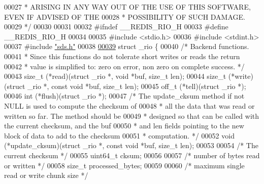\begin{DoxyCode}
00027 \textcolor{comment}{ * ARISING IN ANY WAY OUT OF THE USE OF THIS SOFTWARE, EVEN IF ADVISED OF THE}
00028 \textcolor{comment}{ * POSSIBILITY OF SUCH DAMAGE.}
00029 \textcolor{comment}{ */}
00030 
00031 
00032 \textcolor{preprocessor}{#}\textcolor{preprocessor}{ifndef} \textcolor{preprocessor}{\_\_REDIS\_RIO\_H}
00033 \textcolor{preprocessor}{#}\textcolor{preprocessor}{define} \textcolor{preprocessor}{\_\_REDIS\_RIO\_H}
00034 
00035 \textcolor{preprocessor}{#}\textcolor{preprocessor}{include} \textcolor{preprocessor}{<}\textcolor{preprocessor}{stdio}\textcolor{preprocessor}{.}\textcolor{preprocessor}{h}\textcolor{preprocessor}{>}
00036 \textcolor{preprocessor}{#}\textcolor{preprocessor}{include} \textcolor{preprocessor}{<}\textcolor{preprocessor}{stdint}\textcolor{preprocessor}{.}\textcolor{preprocessor}{h}\textcolor{preprocessor}{>}
00037 \textcolor{preprocessor}{#}\textcolor{preprocessor}{include} \hyperlink{sds_8h}{"sds.h"}
00038 
\hyperlink{struct__rio}{00039} \textcolor{keyword}{struct} \_rio \{
00040     \textcolor{comment}{/* Backend functions.}
00041 \textcolor{comment}{     * Since this functions do not tolerate short writes or reads the return}
00042 \textcolor{comment}{     * value is simplified to: zero on error, non zero on complete success. */}
00043     size\_t (*read)(\textcolor{keyword}{struct} \_rio *, \textcolor{keywordtype}{void} *buf, size\_t len);
00044     size\_t (*write)(\textcolor{keyword}{struct} \_rio *, \textcolor{keyword}{const} \textcolor{keywordtype}{void} *buf, size\_t len);
00045     off\_t (*tell)(\textcolor{keyword}{struct} \_rio *);
00046     \textcolor{keywordtype}{int} (*flush)(\textcolor{keyword}{struct} \_rio *);
00047     \textcolor{comment}{/* The update\_cksum method if not NULL is used to compute the checksum of}
00048 \textcolor{comment}{     * all the data that was read or written so far. The method should be}
00049 \textcolor{comment}{     * designed so that can be called with the current checksum, and the buf}
00050 \textcolor{comment}{     * and len fields pointing to the new block of data to add to the checksum}
00051 \textcolor{comment}{     * computation. */}
00052     \textcolor{keywordtype}{void} (*update\_cksum)(\textcolor{keyword}{struct} \_rio *, \textcolor{keyword}{const} \textcolor{keywordtype}{void} *buf, size\_t len);
00053 
00054     \textcolor{comment}{/* The current checksum */}
00055     uint64\_t cksum;
00056 
00057     \textcolor{comment}{/* number of bytes read or written */}
00058     size\_t processed\_bytes;
00059 
00060     \textcolor{comment}{/* maximum single read or write chunk size */}

\end{DoxyCode}
